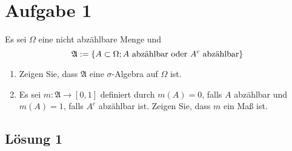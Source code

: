 \documentclass[main.tex]{subfiles}
\begin{document}
\section{Aufgabe 1}

Es sei $\Omega$ eine nicht abzählbare Menge und 
$$
\mathfrak{A} := \set{A\subset \Omega; A\ \text{abzählbar oder}\ A^c\ \text{abzählbar}}
$$

\begin{enumerate}
    \item Zeigen Sie, dass $\mathfrak{A}$ eine $\sigma$-Algebra auf $\Omega$ ist.
    \item Es sei $m: \mathfrak{A}\to[0, 1]$ definiert durch $m(A) = 0$, falls $A$ abzählbar und $m(A)=1$, falls $A^c$ abzählbar ist. Zeigen Sie, dass $m$ ein Maß ist. 
\end{enumerate}

\subsection{Lösung 1}
\end{document}
